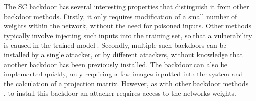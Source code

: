 \documentclass{article}
\theoremstyle{plain}
\theoremstyle{definition}
\theoremstyle{remark}
\begin{document}
The SC backdoor has several interesting properties that distinguish it from other backdoor methods. Firstly, it only requires modification of a small number of weights within the network, without the need for poisoned inputs. Other methods typically involve injecting such inputs into the training set, so that a vulnerability is caused in the trained model . Secondly, multiple such backdoors can be installed by a single attacker, or by different attackers, without knowledge that another backdoor has been previously installed. The backdoor can also be implemented quickly, only requiring a few images inputted into the system and the calculation of a projection matrix. However, as with other backdoor methods , to install this backdoor an attacker requires access to the networks weights.
\end{document}
